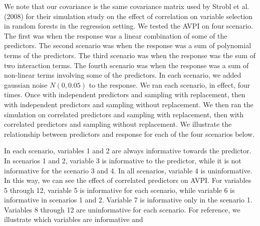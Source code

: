 \documentclass[12pt,twoside]{reedthesis}
\theoremstyle{definition}
\theoremstyle{definition}
\theoremstyle{definition}
\theoremstyle{remark}
\begin{document}
We note that our covariance is the same covariance matrix used by Strobl
et al. (2008) for their simulation study on the effect of correlation on
variable selection in random forests in the regression setting. We
tested the AVPI on four scenario. The first was when the response was a
linear combination of some of the predictors. The second scenario was
when the response was a sum of polynomial terms of the predictors. The
third scenario was when the response was the sum of two interaction
terms. The fourth scenario was when the response was a sum of non-linear
terms involving some of the predictors. In each scenario, we added
gaussian noise \(N(0, 0.05)\) to the response. We ran each scenario, in
effect, four times. Once with independent predictors and sampling with
replacement, then with independent predictors and sampling without
replacement. We then ran the simulation on correlated predictors and
sampling with replacement, then with correlated predictors and sampling
without replacement. We illustrate the relationship between predictors
and response for each of the four scenarios below. \par
\begin{table}[H]
\centering
{}
\end{table}
In each scenario, variables 1 and 2 are always informative towards the
predictor. In scenarios 1 and 2, variable 3 is informative to the
predictor, while it is not informative for the scenario 3 and 4. In all
scenarios, variable 4 is uninformative. In this way, we can see the
effect of correlated predictors on AVPI. For variables 5 through 12,
variable 5 is informative for each scenario, while variable 6 is
informative in scenarios 1 and 2. Variable 7 is informative only in the
scenario 1. Variables 8 through 12 are uninformative for each scenario.
For reference, we illustrate which variables are informative and
\end{document}
